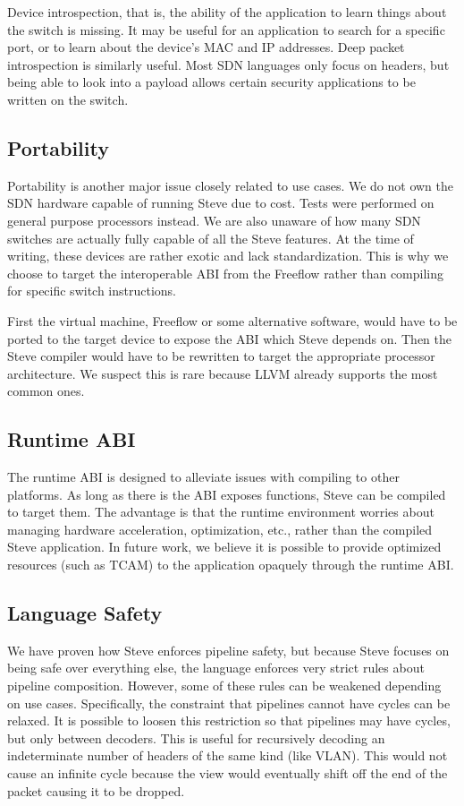 Device introspection, that is, the ability of the application to learn things about the switch is missing.
It may be useful for an application to search for a specific port, or to learn about the device's MAC and IP addresses.
Deep packet introspection is similarly useful. Most SDN languages only focus on headers, but being able to look into a payload allows certain security applications to be written on the switch.

\subsection{Portability}

Portability is another major issue closely related to use cases. We do not own the SDN hardware capable of running Steve due to cost. Tests were performed on general purpose processors instead. We are also unaware of how many SDN switches are actually fully capable of all the Steve features. At the time of writing, these devices are rather exotic and lack standardization. This is why we choose to target the interoperable ABI from the Freeflow rather than compiling for specific switch instructions.

First the virtual machine, Freeflow \cite{freeflow_software} or some alternative software, would have to be ported to the target device to expose the ABI which Steve depends on. Then the Steve compiler would have to be rewritten to target the appropriate processor architecture. We suspect this is rare because LLVM already supports the most common ones.

\subsection{Runtime ABI}

The runtime ABI is designed to alleviate issues with compiling to other platforms.
As long as there is the ABI exposes functions, Steve can be compiled to target them. The advantage is that the runtime environment worries about managing hardware acceleration, optimization, etc., rather than the compiled Steve application. In future work, we believe it is possible to provide optimized resources (such as TCAM) to the application opaquely through the runtime ABI.

\subsection{Language Safety}

We have proven how Steve enforces pipeline safety, but
because Steve focuses on being safe over everything else, the language enforces very strict rules about pipeline composition. However, some of these rules can be weakened depending on use cases.
Specifically, the constraint that pipelines cannot have cycles can be relaxed. It is possible to loosen this restriction so that pipelines may have cycles, but only between decoders. This is useful for recursively decoding an indeterminate number of headers of the same kind (like VLAN). This would not cause an infinite cycle because the view would eventually shift off the end of the packet causing it to be dropped.

